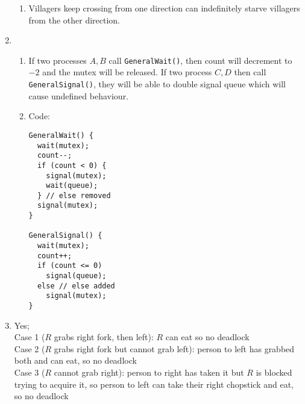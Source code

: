 \documentclass[12pt, a4paper]{article}
\begin{document}
\begin{enumerate}[Q\arabic*.]
\begin{enumerate}[(\alph*.)]
      \item Villagers keep crossing from one direction can indefinitely starve villagers from the other direction.
    \end{enumerate}

  \item 
    \begin{enumerate}[(\alph*.)]
      \item If two processes $A, B$ call \lstinline|GeneralWait()|, then count will decrement to $-2$ and the mutex will be released. If two process $C, D$ then call \lstinline|GeneralSignal()|, they will be able to double signal queue which will cause undefined behaviour.

      \item Code:
        \begin{lstlisting}
GeneralWait() {
  wait(mutex);
  count--;
  if (count < 0) {
    signal(mutex);
    wait(queue);
  } // else removed
  signal(mutex);
}

GeneralSignal() {
  wait(mutex);
  count++;
  if (count <= 0)
    signal(queue);
  else // else added
    signal(mutex);
}
        \end{lstlisting}
    \end{enumerate}

  \item Yes;\\
    Case 1 ($R$ grabs right fork, then left): $R$ can eat so no deadlock\\
    Case 2 ($R$ grabs right fork but cannot grab left): person to left has grabbed both and can eat, so no deadlock\\
    Case 3 ($R$ cannot grab right): person to right has taken it but $R$ is blocked trying to acquire it, so person to left can take their right chopstick and eat, so no deadlock
\end{enumerate}
\end{document}
